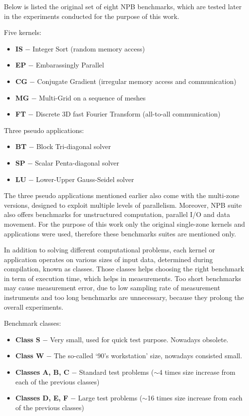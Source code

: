 Below is listed the original set of eight NPB benchmarks, which are tested later in the
experiments conducted for the purpose of this work.

Five kernels:
\begin{itemize}
    \item \textbf{IS} $-$ Integer Sort (random memory access)
    \item \textbf{EP} $-$ Embarassingly Parallel
    \item \textbf{CG} $-$ Conjugate Gradient (irregular memory access and communication)
    \item \textbf{MG} $-$ Multi-Grid on a sequence of meshes
    \item \textbf{FT} $-$ Discrete 3D fast Fourier Transform (all-to-all communication)
\end{itemize}

Three pseudo applications:
\begin{itemize}
    \item \textbf{BT} $-$ Block Tri-diagonal solver
    \item \textbf{SP} $-$ Scalar Penta-diagonal solver
    \item \textbf{LU} $-$ Lower-Upper Gauss-Seidel solver
\end{itemize}

The three pseudo applications mentioned earlier also come with the multi-zone
versions, designed to exploit multiple levels of parallelism. Moreover, NPB
suite also offers benchmarks for unstructured computation, parallel I/O and
data movement. For the purpose of this work only the original single-zone
kernels and applications were used, therefore these benchmarks suites are
mentioned only.

In addition to solving different computational problems, each kernel or
application operates on various sizes of input data, determined during
compilation, known as classes. Those classes helps choosing the right benchmark
in term of execution time, which helps in measurements. Too short benchmarks may
cause measurement error, due to low sampling rate of measurement instruments and
too long benchmarks are unnecessary, because they prolong the overall experiments.

Benchmark classes:
\begin{itemize}
    \item \textbf{Class S} $-$ Very small, used for quick test purpose. Nowadays obsolete.
    \item \textbf{Class W} $-$ The so-called `90's workstation' size, nowadays consisted small.
    \item \textbf{Classes A, B, C} $-$ Standard test problems ($\sim$4 times size increase from
    each of the previous classes)
    \item \textbf{Classes D, E, F} $-$ Large test problems ($\sim$16 times size increase from
    each of the previous classes)
\end{itemize}


